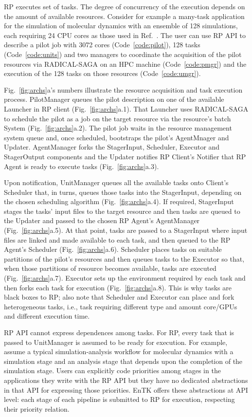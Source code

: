 \documentclass[preprint,12pt, a4paper]{elsarticle}
\begin{document}
RP executes set of tasks. The degree of concurrency of the execution depends
on the amount of available resources. Consider for example a many-task
application for the simulation of molecular dynamics with an ensemble of 128
simulations, each requiring 24 CPU cores as those used in
Ref.~\cite{balasubramanian2016extasy}. The user can use RP API to describe a
pilot job with 3072 cores (Code~\ref{code:pilot}), 128 tasks
(Code~\ref{code:units}) and two managers to coordinate the acquisition of the
pilot resources via RADICAL-SAGA on an HPC machine (Code~\ref{code:pmgr}) and
the execution of the 128 tasks on those resources (Code~\ref{code:umgr}).

Fig.~\ref{fig:archs}a's numbers illustrate the resource acquisition and task
execution process. PilotManager queues the pilot description on one of the
available Launcher in RP client (Fig.~\ref{fig:archs}a.1). That Launcher uses
RADICAL-SAGA to schedule the pilot as a job on the target resource via the
resource's batch System (Fig.~\ref{fig:archs}a.2). The pilot job waits in the
resource management system queue and, once scheduled, bootstraps the pilot's
AgentMnager and Updater. AgentManager forks the StagerInput, Scheduler,
Executor and StagerOutput components and the Updater notifies RP Client's
Notifier that RP Agent is ready to execute tasks (Fig.~\ref{fig:archs}a.3).

Upon notification, UnitManager queues all the available tasks onto Client's
Scheduler that, in turns, queues those tasks into the StagerInput, depending
on the chosen scheduling algorithm (Fig.~\ref{fig:archs}a.4). If required,
StagerInput stages the tasks' input files to the target resource and then
tasks are queued to the Updater and passed to the chosen RP Agent's
AgentManager (Fig.~\ref{fig:archs}a.5). At that point, tasks are passed to a
StagerInput where input files are linked and made available to each task, and
then queued to the RP Agent's Scheduler (Fig.~\ref{fig:archs}a.6). Scheduler
places tasks on suitable partitions of the pilot's resources and then queues
tasks to the Executor so that, when those partitions of resource becomes
available, tasks are executed (Fig.~\ref{fig:archs}a.7). Executor sets up the
environment required by each task and then forks each task for execution
(Fig.~\ref{fig:archs}a.8). This is why tasks are black boxes to RP\@; also
note that Scheduler and Executor can place and fork heterogeneous tasks,
i.e., task requiring different type and amount core/GPUs and different
execution time.

RP API cannot express dependences among tasks. For RP, every task that is
passed to UnitManager is assumed to be ready for execution. For example,
assume a typical simulation-analysis workflow for molecular dynamics with a
simulation stage and an analysis stage that depends upon the completion of
the simulation stage. Users can explicitly code priorities among stages in
the applications they write with the RP API but they have no dedicated
abstractions in that API for expressing those priorities. EnTK offers these
abstractions at API level: each stage of each pipeline is submitted to RP for
execution, respecting their priority relation.
\end{document}
